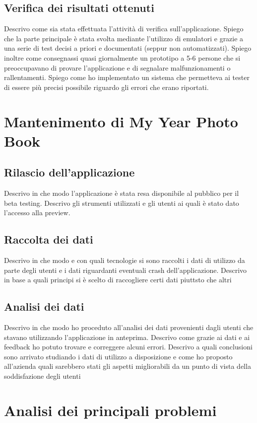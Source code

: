 		\subsection{Verifica dei risultati ottenuti}
			Descrivo come sia stata effettuata l'attività di verifica sull'applicazione. Spiego che la parte principale è stata
			svolta mediante l'utilizzo di emulatori e grazie a una serie di test decisi a priori e documentati (seppur non
			automatizzati). Spiego inoltre come consegnassi quasi giornalmente un prototipo a 5-6 persone che si preoccupavano
			di provare l'applicazione e di segnalare malfunzionamenti o rallentamenti. Spiego come ho implementato un sistema
			che permetteva ai tester di essere più precisi possibile riguardo gli errori che erano riportati.
	\section{Mantenimento di My Year Photo Book}
		\subsection{Rilascio dell'applicazione}
			Descrivo in che modo l'applicazione è stata resa disponibile al pubblico per il beta testing. Descrivo gli strumenti
			utilizzati e gli utenti ai quali è stato dato l'accesso alla preview.
		\subsection{Raccolta dei dati}
			Descrivo in che modo e con quali tecnologie si sono raccolti i dati di utilizzo da parte degli utenti e i dati riguardanti
			eventuali crash dell'applicazione. Descrivo in base a quali principi si è scelto di raccogliere certi dati piuttsto che altri
		\subsection{Analisi dei dati}
			Descrivo in che modo ho proceduto all'analisi dei dati provenienti dagli utenti che stavano utilizzando l'applicazione in
			anteprima. Descrivo come grazie ai dati e ai feedback ho potuto trovare e correggere alcuni errori. Descrivo a quali
			conclusioni sono arrivato studiando i dati di utilizzo a disposizione e come ho proposto all'azienda quali sarebbero stati
			gli aspetti migliorabili da un punto di vista della soddisfazione degli utenti
	\section{Analisi dei principali problemi}
